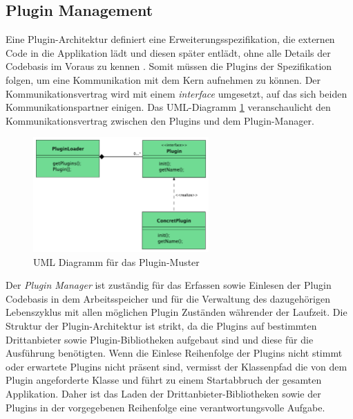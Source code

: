 	\subsection{Plugin Management}
		Eine Plugin-Architektur definiert eine Erweiterungsspezifikation, die externen Code in die Applikation lädt und diesen später entlädt, ohne alle Details der Codebasis im Voraus zu kennen \cite{Duvigneau09}. Somit müssen die Plugins der Spezifikation folgen, um eine Kommunikation mit dem Kern aufnehmen zu können. Der Kommunikationsvertrag wird mit einem \textit{interface} umgesetzt, auf das sich beiden Kommunikationspartner einigen. Das UML-Diagramm \ref{fig:pluginUMLD} veranschaulicht den Kommunikationsvertrag zwischen den Plugins und dem Plugin-Manager. \bigbreak
		\begin{figure}[h!]
			\centering
			\includegraphics[width=0.6\textwidth]{material/images/pluginKonzept.pdf}
			\caption{UML Diagramm für das Plugin-Muster \cite{tubiblio36573}}
			\label{fig:pluginUMLD}
		\end{figure}
		Der \textit{Plugin Manager} ist zuständig für das Erfassen sowie Einlesen der Plugin Codebasis in dem Arbeitsspeicher und für die Verwaltung des dazugehörigen Lebenszyklus mit allen möglichen Plugin Zuständen währender der Laufzeit. Die Struktur der Plugin-Architektur ist strikt, da die Plugins auf bestimmten Drittanbieter sowie Plugin-Bibliotheken aufgebaut sind und diese für die Ausführung benötigten. Wenn die Einlese Reihenfolge der Plugins nicht stimmt oder erwartete Plugins nicht präsent sind, vermisst der Klassenpfad die von dem Plugin angeforderte Klasse und führt zu einem Startabbruch der gesamten Applikation. Daher ist das Laden der Drittanbieter-Bibliotheken sowie der Plugins in der vorgegebenen Reihenfolge eine verantwortungsvolle Aufgabe. 

